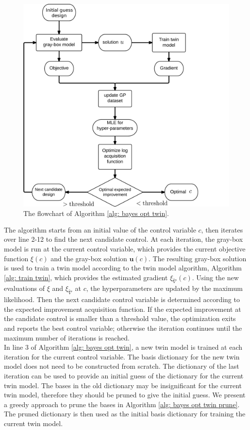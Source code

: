 \begin{figure}
    \begin{center}
        \includegraphics[width=12cm]{../opt_framework_2.png}
        \caption{The flowchart of Algorithm \ref{alg: bayes opt twin}.}
        \label{fig: opt flowchart}
    \end{center}
\end{figure}

The algorithm starts from an initial value of the control variable $c$, then
iterates over line 2-12 to find the next candidate control.
At each iteration, the gray-box model is run at the current control variable, which 
provides the current objective function $\xi(c)$ and the gray-box solution
$\boldsymbol{u}(c)$.
The resulting gray-box solution is used to train a twin model according to the
twin model algorithm, Algorithm 
\ref{alg: train twin}, which provides the estimated gradient $\xi_{\tilde{\nabla}}(c)$.
Using the new evaluations of $\xi$ and $\xi_{\tilde{\nabla}}$ at $c$, the hyperparameters are
updated by the maximum likelihood. Then the next candidate control variable is determined
according to the expected improvement acquisition function. If the expected improvement at
the candidate control is smaller than a threshold value, the optimization exits and reports 
the best control variable; otherwise the iteration continues until the maximum number of
iterations is reached.\\

In line 3 of Algorithm \ref{alg: bayes opt twin},
a new twin model is trained at each iteration for the current control variable.
The basis dictionary for the new twin model does not need to be constructed from scratch.
The dictionary of the last iteration can be used to provide an initial guess of the dictionary
for the current twin model. The bases in the old dictionary may be insignificant for
the current twin model, therefore they should be pruned to give the initial guess.
We present a greedy approach to prune the bases in 
Algorithm \ref{alg: bayes opt twin prune}.
The pruned dictionary is then used as the initial basis dictionary for training the current
twin model. 


